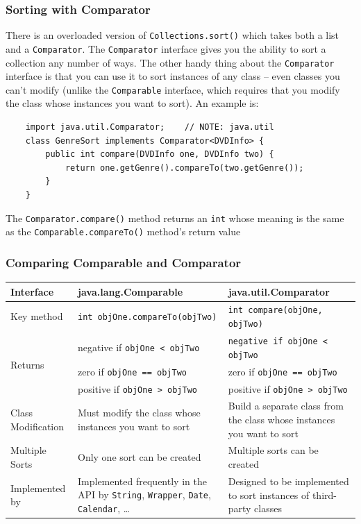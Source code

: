 \subsubsection{Sorting with Comparator}
There is an overloaded version of \verb#Collections.sort()# which takes both a 
list and a \verb#Comparator#. The \verb#Comparator# interface gives you the 
ability to sort a collection any number of ways. The other handy thing about 
the \verb#Comparator# interface is that you can use it to sort instances of any 
class -- even classes you can't modify (unlike the \verb#Comparable# interface, 
which requires that you modify the class whose instances you want to sort). An 
example is:
\begin{verbatim}
    import java.util.Comparator;    // NOTE: java.util
    class GenreSort implements Comparator<DVDInfo> {
        public int compare(DVDInfo one, DVDInfo two) {
            return one.getGenre().compareTo(two.getGenre());
        }
    }
\end{verbatim}
The \verb#Comparator.compare()# method returns an \verb#int# whose meaning is 
the same as the \verb#Comparable.compareTo()# method's return value

\subsubsection{Comparing Comparable and Comparator}
\begin{center}
\begin{tabular}{lp{6cm}p{6cm}}
    \textbf{Interface} & \textbf{java.lang.Comparable} & 
    \textbf{java.util.Comparator} \\
    \hline
    Key method & \verb#int objOne.compareTo(objTwo)# &
    \verb#int compare(objOne, objTwo)# \\
    \hline
    \multirow{3}{*}{Returns} & negative if \verb#objOne < objTwo# &
    \verb#negative if objOne < objTwo# \\
    & zero if \verb#objOne == objTwo# & zero if \verb#objOne == objTwo# \\
    & positive if \verb#objOne > objTwo# & positive if \verb#objOne > objTwo# 
    \\
    \hline
    Class Modification & Must modify the class whose instances you want to sort 
    & Build a separate class from the class whose instances you want to sort \\
    \hline
    Multiple Sorts & Only one sort can be created & Multiple sorts can be 
    created \\
    \hline
    Implemented by & Implemented frequently in the API by \verb#String#, 
    \verb#Wrapper#, \verb#Date#, \verb#Calendar#, \ldots & Designed to be 
    implemented to sort instances of third-party classes
\end{tabular}
\end{center}

